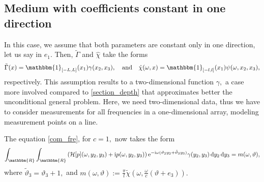 \documentclass[a4paper,twoside,10pt]{article}
\theoremstyle{break}
\theoremstyle{nonumberplain}
\newcommand{\R}{\mathbbm{R}}
\newcommand{\id}{\mathbbm{1}}
\newcommand{\e}{\mathrm e}
\renewcommand{\i}{\mathrm i}
\renewcommand{\d}{\,\mathrm d}
\begin{document}
\subsection{Medium with coefficients constant in one direction}\label{section_2d}
In this case, we assume that both parameters are constant only in one direction, let us say in $e_1 .$  Then, $\tilde\Gamma$ and $\hat\chi$ take the forms
\begin{equation*}
\tilde\Gamma (x)  = \id_{[-L,L]} (x_1 ) \gamma (x_2, x_3)  , \quad \text{and} \quad  \hat\chi (\omega , x) = \id_{[-l,l]} (x_1 ) \psi (\omega , x_2, x_3 ) ,
\end{equation*}
respectively. This assumption results to a two-dimensional function $\gamma,$ a case more involved compared to \autoref{section_depth} that approximates better the unconditional general problem.
Here, we need two-dimensional data, thus we have to consider measurements for all frequencies in a one-dimensional array, modeling measurement points on a line. 

The equation \eqref{com_fre}, for $c=1,$ now takes the form
\begin{equation}\label{foc_fredholm_2d}
\int_{\R} \int_{\R} \left(\mathcal{H} [p] (\omega , y_2 , y_3) + \i p (\omega ,y_2 , y_3) \right)  \e^{- \i \omega (\vartheta_2 y_2 + \tilde\vartheta_3 y_3 )} \gamma (y_2 , y_3) \d y_2  \d y_3 =  m ( \omega, \vartheta )  ,
\end{equation}
where $\tilde\vartheta_3 = \vartheta_3 +1,$  and $m (\omega, \vartheta ) := \frac{\pi}{l}  \tilde\chi (\omega,\tfrac\omega c(\vartheta+e_3)). $
\end{document}
